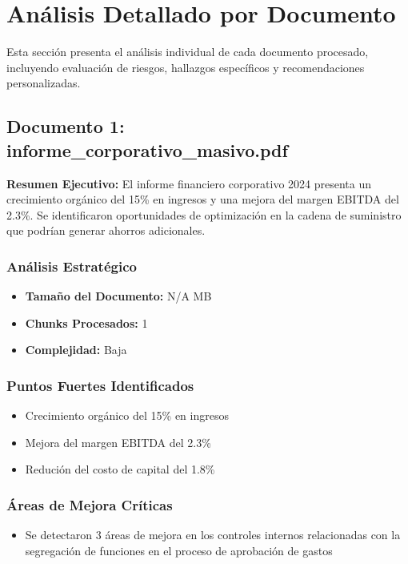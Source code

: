 \documentclass[11pt]{report}
\begin{document}
\chapter{Análisis Detallado por Documento}

Esta sección presenta el análisis individual de cada documento procesado, 
incluyendo evaluación de riesgos, hallazgos específicos y recomendaciones 
personalizadas.


\section{Documento 1: informe_corporativo_masivo.pdf}

\begin{tcolorbox}[colback=warning-yellow!10!white, colframe=warning-yellow, title=Evaluación de Riesgo: MEDIO]
\textbf{Resumen Ejecutivo:} El informe financiero corporativo 2024 presenta un crecimiento orgánico del 15\% en ingresos y una mejora del margen EBITDA del 2.3\%. Se identificaron oportunidades de optimización en la cadena de suministro que podrían generar ahorros adicionales.
\end{tcolorbox}

\subsection{Análisis Estratégico}
\begin{itemize}
    \item \textbf{Tamaño del Documento:} N/A MB
    \item \textbf{Chunks Procesados:} 1
    \item \textbf{Complejidad:} Baja
\end{itemize}

\subsection{Puntos Fuertes Identificados}
\begin{itemize}
    \item Crecimiento orgánico del 15\% en ingresos
    \item Mejora del margen EBITDA del 2.3\%
    \item Redución del costo de capital del 1.8\%
\end{itemize}

\subsection{Áreas de Mejora Críticas}
\begin{itemize}
    \item Se detectaron 3 áreas de mejora en los controles internos relacionadas con la segregación de funciones en el proceso de aprobación de gastos
\end{itemize}
\end{document}
